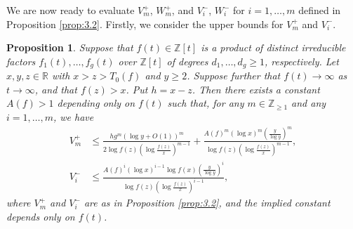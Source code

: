 \documentclass[a4paper,11pt]{amsart}
\newtheorem{proposition}[theorem]{Proposition}
\theoremstyle{definition}
\numberwithin{equation}{section}
\begin{document}
We are now ready to evaluate $V_m^+$, $W_m^+$, and $V_i^-$, $W_i^-$ for $i=1,\ldots,m$ defined in Proposition \ref{prop:3.2}. 
Firstly, we consider the upper bounds for $V_m^+$ and $V_i^-$. 

\begin{proposition}\label{prop:4.3}
Suppose that $f(t) \in \mathbb{Z}[t]$ is a product of distinct irreducible factors $f_1(t), \ldots, f_g(t)$ over $\mathbb{Z}[t]$ of degrees $d_1, \ldots, d_g \geq1$, respectively. 
Let $x,y,z \in \mathbb{R}$ with $x>z>T_0(f)$ and $y \geq2$. 
Suppose further that $f(t) \to\infty$ as $t \to\infty$, and that $f(z)>x$. 
Put $h=x-z$. 
Then there exists a constant $A(f)>1$ depending only on $f(t)$ such that, for any $m \in \mathbb{Z}_{\geq1}$ and any $i =1,\ldots,m$, we have
\begin{align*}
V_m^+
&\leq \frac{hg^m (\log{y}+O(1))^m}{2\log{f(z)} \left(\log{\frac{f(z)}{x}}\right)^{m-1}} 
+ \frac{A(f)^m (\log{x})^m \left(\frac{y}{\log{y}}\right)^m }{\log{f(z)} \left(\log{\frac{f(z)}{x}}\right)^{m-1}}, \\
V_i^-
&\leq \frac{A(f)^i (\log{x})^{i-1} \log{f(x)} \left(\frac{y}{\log{y}}\right)^i }{\log{f(z)} \left(\log{\frac{f(z)}{x}}\right)^{i-1}}, 
\end{align*}
where $V_m^+$ and $V_i^-$ are as in Proposition \ref{prop:3.2}, and the implied constant depends only on $f(t)$.
\end{proposition}
\end{document}
